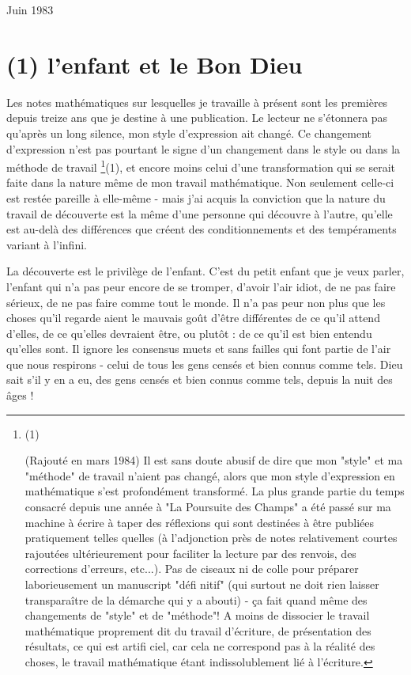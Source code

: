 Juin 1983

\section{(1) l'enfant et le Bon Dieu}

Les notes mathématiques sur lesquelles je travaille à présent sont les premières depuis treize ans que je destine à une publication. Le lecteur ne s'étonnera pas qu'après un long silence, mon style d'expression ait changé. Ce changement d'expression n'est pas pourtant le signe d'un changement dans le style ou dans la méthode de travail \footnote{(1)\par(Rajouté en mars 1984) Il est sans doute abusif de dire que mon "style" et ma "méthode" de travail n'aient pas changé, alors que mon style d'expression en mathématique s'est profondément transformé. La plus grande partie du temps consacré depuis une année à "La Poursuite des Champs" a été passé sur ma machine à écrire à taper des réflexions qui sont destinées à être publiées pratiquement telles quelles (à l'adjonction près de notes relativement courtes rajoutées ultérieurement pour faciliter la lecture par des renvois, des corrections d'erreurs, etc...). Pas de ciseaux ni de colle pour préparer laborieusement un manuscript "défi nitif" (qui surtout ne doit rien laisser transparaître de la démarche qui y a abouti) - ça fait quand même des changements de "style" et de "méthode"! A moins de dissocier le travail mathématique proprement dit du travail d'écriture, de présentation des résultats, ce qui est artifi ciel, car cela ne correspond pas à la réalité des choses, le travail mathématique étant indissolublement lié à l'écriture.}(1), et encore moins celui d'une transformation qui se serait faite dans la nature même de mon travail mathématique. Non seulement celle-ci est restée pareille à elle-même - mais j'ai acquis la conviction que la nature du travail de découverte est la même d'une personne qui découvre à l'autre, qu'elle est au-delà des différences que créent des conditionnements et des tempéraments variant à l'infini.

La découverte est le privilège de l'enfant. C'est du petit enfant que je veux parler, l'enfant qui n'a pas peur encore de se tromper, d'avoir l'air idiot, de ne pas faire sérieux, de ne pas faire comme tout le monde. Il n'a pas peur non plus que les choses qu'il regarde aient le mauvais goût d'être différentes de ce qu'il attend d'elles, de ce qu'elles devraient être, ou plutôt : de ce qu'il est bien entendu qu'elles sont. Il ignore les consensus muets et sans failles qui font partie de l'air que nous respirons - celui de tous les gens censés et bien connus comme tels. Dieu sait s'il y en a eu, des gens censés et bien connus comme tels, depuis la nuit des âges !

